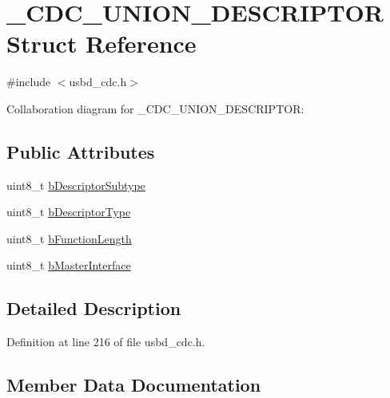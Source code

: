 \hypertarget{struct__CDC__UNION__DESCRIPTOR}{}\section{\+\_\+\+C\+D\+C\+\_\+\+U\+N\+I\+O\+N\+\_\+\+D\+E\+S\+C\+R\+I\+P\+T\+OR Struct Reference}
\label{struct__CDC__UNION__DESCRIPTOR}


{\ttfamily \#include $<$usbd\+\_\+cdc.\+h$>$}



Collaboration diagram for \+\_\+\+C\+D\+C\+\_\+\+U\+N\+I\+O\+N\+\_\+\+D\+E\+S\+C\+R\+I\+P\+T\+OR\+:
\subsection*{Public Attributes}
\begin{DoxyCompactItemize}
\item 
uint8\+\_\+t \hyperlink{struct__CDC__UNION__DESCRIPTOR_a5d9d4e51f6313dd40d479cbd688b8c8d}{b\+Descriptor\+Subtype}
\item 
uint8\+\_\+t \hyperlink{struct__CDC__UNION__DESCRIPTOR_a605016c2bd378f5dd95533edf130b4c9}{b\+Descriptor\+Type}
\item 
uint8\+\_\+t \hyperlink{struct__CDC__UNION__DESCRIPTOR_a1dfd18183a0989b8631c11b718ce3819}{b\+Function\+Length}
\item 
uint8\+\_\+t \hyperlink{struct__CDC__UNION__DESCRIPTOR_aaa7e80367c520e1fc09a73f336df048e}{b\+Master\+Interface}
\end{DoxyCompactItemize}


\subsection{Detailed Description}


Definition at line 216 of file usbd\+\_\+cdc.\+h.



\subsection{Member Data Documentation}
